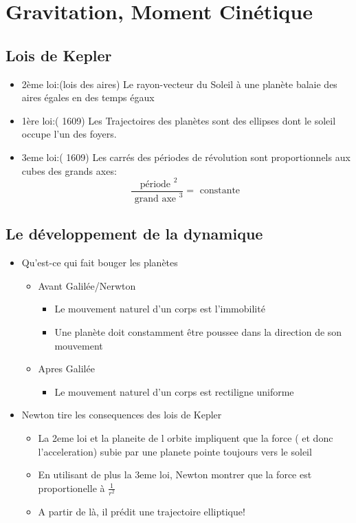 \documentclass[../main.tex]{subfiles}
\begin{document}
\section{Gravitation, Moment Cinétique}
\subsection{Lois de Kepler}
\begin{itemize}
	\item 2ème loi:(lois des aires) Le rayon-vecteur du Soleil à une planète balaie des aires égales en des temps égaux
	\item 1ère loi:( 1609) Les Trajectoires des planètes sont des ellipses dont le soleil occupe l'un des foyers.
	\item 3eme loi:( 1609) Les carrés des périodes de révolution sont proportionnels aux cubes des grands axes:
		\[ 
		\frac{ \text{ période } ^{2}}{ \text{ grand axe } ^{3}}= \text{ constante } 
		\]
		
\end{itemize}
\subsection{Le développement de la dynamique}
\begin{itemize}
\item Qu'est-ce qui fait bouger les planètes
	\begin{itemize}
	\item Avant Galilée/Nerwton
		\begin{itemize}
		\item Le mouvement naturel d'un corps est l'immobilité
		\item Une planète doit constamment être poussee dans la direction de son mouvement
		\end{itemize}

	\item Apres Galilée

		\begin{itemize}
		\item Le mouvement naturel d'un corps est rectiligne uniforme
		\end{itemize}
		
	
	\end{itemize}

\item Newton tire les consequences des lois de Kepler
	\begin{itemize}
		\item La 2eme loi et la planeite de l orbite impliquent que la force ( et donc l'acceleration) subie par une planete pointe toujours vers le soleil
		\item En utilisant de plus la 3eme loi, Newton montrer que la force est proportionelle à $\frac{1}{r^{2}}$ 
		\item A partir de là, il prédit une trajectoire elliptique!
	\end{itemize}
	

\end{itemize}
\end{document}
